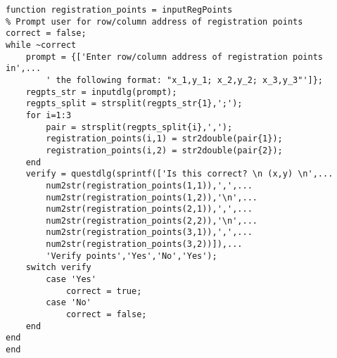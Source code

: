 \begin{lstlisting}
function registration_points = inputRegPoints
% Prompt user for row/column address of registration points
correct = false;
while ~correct
    prompt = {['Enter row/column address of registration points in',...
        ' the following format: "x_1,y_1; x_2,y_2; x_3,y_3"']};
    regpts_str = inputdlg(prompt);
    regpts_split = strsplit(regpts_str{1},';');
    for i=1:3
        pair = strsplit(regpts_split{i},',');
        registration_points(i,1) = str2double(pair{1});
        registration_points(i,2) = str2double(pair{2});
    end
    verify = questdlg(sprintf(['Is this correct? \n (x,y) \n',...
        num2str(registration_points(1,1)),',',...
        num2str(registration_points(1,2)),'\n',...
        num2str(registration_points(2,1)),',',...
        num2str(registration_points(2,2)),'\n',...
        num2str(registration_points(3,1)),',',...
        num2str(registration_points(3,2))]),...
        'Verify points','Yes','No','Yes');
    switch verify
        case 'Yes'
            correct = true;
        case 'No'
            correct = false;
    end
end
end


\end{lstlisting}